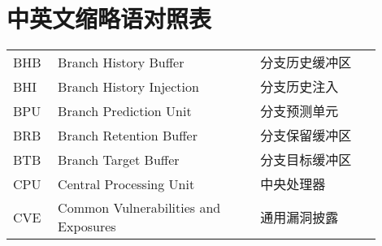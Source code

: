 %
%

\chapter*{中英文缩略语对照表}

\begin{center}
\begin{spacing}{1.39}
\renewcommand\arraystretch{1}
\setlength{\tabcolsep}{4pt}
\begin{tabular}{p{0.1\linewidth}p{0.5\linewidth}p{0.3\linewidth}}
BHB & Branch History Buffer & 分支历史缓冲区 \\
BHI & Branch History Injection & 分支历史注入 \\
BPU & Branch Prediction Unit & 分支预测单元 \\
BRB & Branch Retention Buffer & 分支保留缓冲区 \\
BTB & Branch Target Buffer & 分支目标缓冲区 \\
CPU & Central Processing Unit & 中央处理器 \\
CVE & Common Vulnerabilities and Exposures & 通用漏洞披露 \\
\end{tabular}
\end{spacing}
\end{center}
